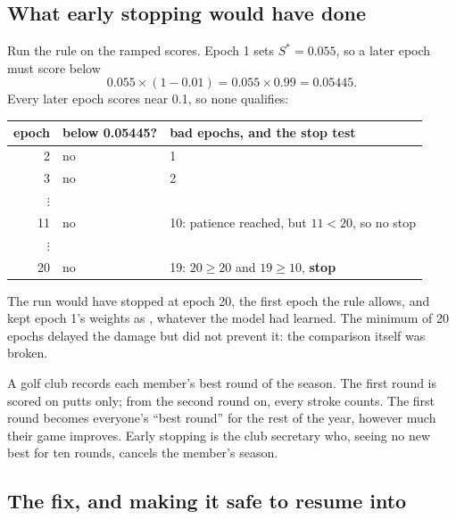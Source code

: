 
\subsection{What early stopping would have done}

Run the rule on the ramped scores. Epoch 1 sets $S^\ast = 0.055$, so a later epoch must score below
\[
  0.055 \times (1 - 0.01) = 0.055 \times 0.99 = 0.05445.
\]
Every later epoch scores near 0.1, so none qualifies:
\begin{center}
\begin{tabular}{rll}
\toprule
epoch & below 0.05445? & bad epochs, and the stop test\\
\midrule
2 & no & 1\\
3 & no & 2\\
$\vdots$ & & \\
11 & no & 10: patience reached, but $11 < 20$, so no stop\\
$\vdots$ & & \\
20 & no & 19: $20 \ge 20$ and $19 \ge 10$, \textbf{stop}\\
\bottomrule
\end{tabular}
\end{center}
The run would have stopped at epoch 20, the first epoch the rule allows, and kept epoch 1's weights as ,
whatever the model had learned. The minimum of 20 epochs delayed the damage but did not prevent it: the comparison
itself was broken.

\begin{analogy}
A golf club records each member's best round of the season. The first round is scored on putts only; from the second
round on, every stroke counts. The first round becomes everyone's ``best round'' for the rest of the year, however
much their game improves. Early stopping is the club secretary who, seeing no new best for ten rounds, cancels the
member's season.
\end{analogy}

\subsection{The fix, and making it safe to resume into}

